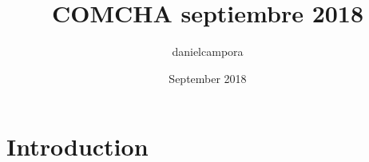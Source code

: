 \documentclass{article}
\title{COMCHA septiembre 2018}
\author{danielcampora }
\date{September 2018}
\begin{document}
\maketitle

\section{Introduction}
\end{document}
